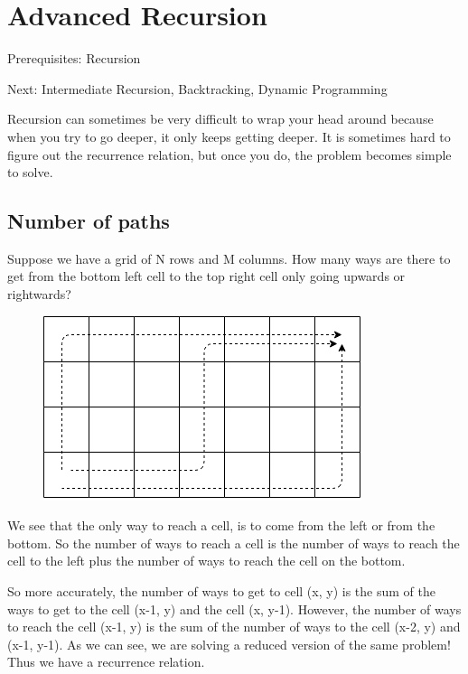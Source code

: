 \documentclass[11pt,oneside]{book}
\makeatletter
\def\maxwidth#1{\ifdim\Gin@nat@width>#1 #1\else\Gin@nat@width\fi}
\makeatother
\begin{document}
        \section{ Advanced Recursion }
        

Prerequisites: Recursion

Next: Intermediate Recursion, Backtracking, Dynamic Programming

Recursion can sometimes be very difficult to wrap your head around because when you try to go deeper, it only keeps getting deeper. It is sometimes hard to figure out the recurrence relation, but once you do, the problem becomes simple to solve.

\subsection{Number of paths}

Suppose we have a grid of N rows and M columns. How many ways are there to get from the bottom left cell to the top right cell only going upwards or rightwards?

\vspace{5px}\begin{figure}[H]\centering
        \includegraphics[width=0.66\maxwidth{\textwidth}]{recursion_grid.png}
        \end{figure}

We see that the only way to reach a cell, is to come from the left or from the bottom. So the number of ways to reach a cell is the number of ways to reach the cell to the left plus the number of ways to reach the cell on the bottom.

So more accurately, the number of ways to get to cell (x, y) is the sum of the ways to get to the cell (x-1, y) and the cell (x, y-1). However, the number of ways to reach the cell (x-1, y) is the sum of the number of ways to the cell (x-2, y) and (x-1, y-1). As we can see, we are solving a reduced version of the same problem! Thus we have a recurrence relation.
\end{document}
